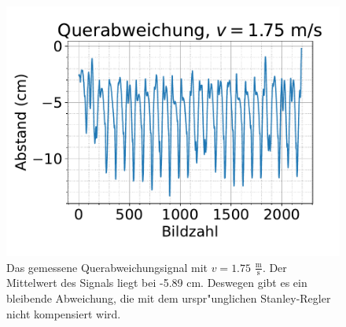 \documentclass[arbeit=studie,oneside,BCOR=12mm]{ArbeitRST}
\begin{document}
\begin{figure}[h]
    \centering
    \includegraphics[scale=0.47]{querabweichung}
    \caption{Das gemessene Querabweichungsignal mit $v = 1.75$ $\frac{\mathrm{m}}{\mathrm{s}}$. Der Mittelwert
    des Signals liegt bei -5.89 cm. Deswegen gibt es ein bleibende Abweichung, die 
    mit dem urspr"unglichen Stanley-Regler nicht kompensiert wird.}
    \label{quer}
\end{figure}

\printbibliography
\listoffigures
\end{document}
